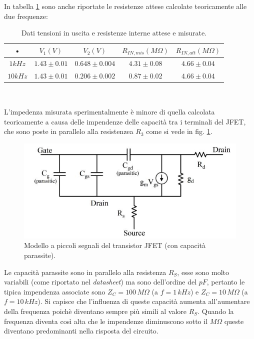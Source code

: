 \documentclass[10pt,a4paper]{article}
\begin{document}
In tabella \ref{tabellaInterna} sono anche riportate le resistenze attese calcolate teoricamente alle due frequenze:\\

\begin{table}[!htb]\centering
\begin{tabular}{|c|c|c|c|c|}
\hline 
• & $V_1 (V)$ & $V_2 (V)$ & $R_{IN, mis} (M\Omega)$ & $R_{IN, att} (M\Omega)$ \\ 
\hline
$1 kHz$ & $1.43 \pm 0.01$ & $0.648 \pm 0.004$ & $4.31 \pm 0.08$ & $4.66\pm0.04$\\ 
\hline 
$10 kHz$ & $1.43 \pm 0.01$ & $0.206 \pm 0.002$ & $0.87\pm0.02$ & $4.66\pm0.04$ \\ 
\hline 
\end{tabular}\\
\caption{Dati tensioni in uscita e resistenze interne attese e misurate.}
\label{tabellaInterna}
\end{table}

L'impedenza misurata sperimentalmente è minore di quella calcolata teoricamente a causa delle impendenze delle capacità tra i terminali del JFET, che sono poste in parallelo alla resistenzea $R_3$ come si vede in fig. \ref{piccoliSegnali}.

\begin{figure}
\centering
\includegraphics[scale=0.8]{image21.jpg}
\caption{Modello a piccoli segnali del transistor JFET (con capacità parassite).}\label{piccoliSegnali}
\end{figure}

Le capacità parassite sono in parallelo alla resistenza $R_S$, esse sono molto variabili (come riportato nel \emph{datasheet}) ma sono dell'ordine del $pF$, pertanto le tipica impendenza associate sono $Z_C = 100 \, M\Omega$ (a $f=1\, kHz$) e  $Z_C = 10\, M\Omega$ (a $f=10 \, kHz$). Si capisce che l'influenza di queste capacità aumenta all'aumentare della frequenza poichè diventano sempre più simili al valore $R_S$. Quando la frequenza diventa così alta che le impendenze diminuscono sotto il $M\Omega$ queste diventano predominanti nella risposta del circuito.
\end{document}
